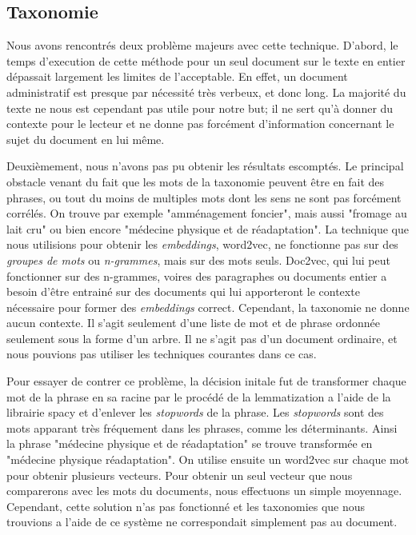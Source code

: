 
\subsection{Taxonomie}%
Nous avons rencontrés deux problème majeurs avec cette technique.
D'abord, le temps d'execution de cette méthode pour un seul document sur le texte en entier dépassait largement les limites de l'acceptable.
En effet, un document administratif est presque par nécessité très verbeux, et donc long. La majorité du texte ne nous est cependant pas utile pour notre but; 
il ne sert qu'à donner du contexte pour le lecteur et ne donne pas forcément d'information concernant le sujet du document en lui même. 

Deuxièmement, nous n'avons pas pu obtenir les résultats escomptés.
Le principal obstacle venant du fait que les mots de la taxonomie peuvent être en fait des phrases, ou tout du moins de multiples mots dont les sens ne sont pas forcément corrélés.
On trouve par exemple "amménagement foncier", mais aussi "fromage au lait cru" ou bien encore "médecine physique et de réadaptation".
La technique que nous utilisions pour obtenir les \textit{embeddings}, word2vec, ne fonctionne pas sur des \textit{groupes de mots} ou \textit{n-grammes}, mais sur des mots seuls.
Doc2vec, qui lui peut fonctionner sur des n-grammes, voires des paragraphes ou documents entier a besoin d'être entrainé sur des documents qui lui apporteront le contexte nécessaire pour former des \textit{embeddings} correct.
Cependant, la taxonomie ne donne aucun contexte.
Il s'agit seulement d'une liste de mot et de phrase ordonnée seulement sous la forme d'un arbre.
Il ne s'agit pas d'un document ordinaire, et nous pouvions pas utiliser les techniques courantes dans ce cas. 

Pour essayer de contrer ce problème, la décision initale fut de transformer chaque mot de la phrase en sa racine par le procédé de la lemmatization a l'aide de la librairie spacy\cite{spacy} et d'enlever les \textit{stopwords} de la phrase.
Les \textit{stopwords} sont des mots apparant très fréquement dans les phrases, comme les déterminants.
Ainsi la phrase "médecine physique et de réadaptation" se trouve transformée en "médecine physique réadaptation".
On utilise ensuite un word2vec sur chaque mot pour obtenir plusieurs vecteurs. Pour obtenir un seul vecteur que nous comparerons avec les mots du documents, nous effectuons un simple moyennage.
Cependant, cette solution n'as pas fonctionné et les taxonomies que nous trouvions a l'aide de ce système ne correspondait simplement pas au document. 

